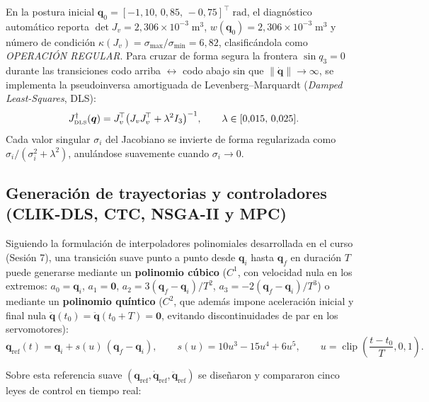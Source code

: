 \documentclass[11pt,a4paper]{article}
\newcommand{\T}{^{\!\top}}
\newcommand{\norm}[1]{\left\lVert#1\right\rVert}
\newcommand{\qdot}{\dot{\bm{q}}}
\newcommand{\qddot}{\ddot{\bm{q}}}
\newcommand{\Jdls}{J^{\dagger}_{\text{\tiny DLS}}}
\begin{document}
\medskip
En la postura inicial $\bm{q}_{0}=[-1{,}10,\,0{,}85,\,-0{,}75]\T\;\text{rad}$, el diagnóstico automático reporta $\det J_{v}=2{,}306\times 10^{-3}\;\text{m}^{3}$, $w(\bm{q}_{0})=2{,}306\times 10^{-3}\;\text{m}^{3}$ y número de condición $\kappa(J_{v})=\sigma_{\max}/\sigma_{\min}=6{,}82$, clasificándola como \emph{OPERACIÓN REGULAR}. Para cruzar de forma segura la frontera $\sin q_{3}=0$ durante las transiciones codo arriba $\leftrightarrow$ codo abajo sin que $\norm{\qdot}\to\infty$, se implementa la pseudoinversa amortiguada de Levenberg--Marquardt (\emph{Damped Least-Squares}, DLS):
\begin{equation}\label{eq:dls}
\Jdls(\bm{q})=J_{v}\T\bigl(J_{v}J_{v}\T+\lambda^{2}I_{3}\bigr)^{-1},\qquad \lambda\in[0{,}015,\,0{,}025].
\end{equation}
Cada valor singular $\sigma_{i}$ del Jacobiano se invierte de forma regularizada como $\sigma_{i}/(\sigma_{i}^{2}+\lambda^{2})$, anulándose suavemente cuando $\sigma_{i}\to 0$.

\subsection{Generación de trayectorias y controladores (CLIK-DLS, CTC, NSGA-II y MPC)}
\label{sec:ctrl}

Siguiendo la formulación de interpoladores polinomiales desarrollada en el curso (Sesión 7), una transición suave punto a punto desde $\bm{q}_{i}$ hasta $\bm{q}_{f}$ en duración $T$ puede generarse mediante un \textbf{polinomio cúbico} ($C^{1}$, con velocidad nula en los extremos: $a_{0}=\bm{q}_{i}$, $a_{1}=\bm{0}$, $a_{2}=3(\bm{q}_{f}-\bm{q}_{i})/T^{2}$, $a_{3}=-2(\bm{q}_{f}-\bm{q}_{i})/T^{3}$) o mediante un \textbf{polinomio quíntico} ($C^{2}$, que además impone aceleración inicial y final nula $\qddot(t_{0})=\qddot(t_{0}+T)=\bm{0}$, evitando discontinuidades de par en los servomotores):
\begin{equation}\label{eq:quintic}
\bm{q}_{\text{ref}}(t)=\bm{q}_{i}+s(u)\,(\bm{q}_{f}-\bm{q}_{i}),\qquad s(u)=10u^{3}-15u^{4}+6u^{5},\qquad u=\operatorname{clip}\!\left(\frac{t-t_{0}}{T},0,1\right).
\end{equation}

Sobre esta referencia suave $(\bm{q}_{\text{ref}},\qdot_{\text{ref}},\qddot_{\text{ref}})$ se diseñaron y compararon cinco leyes de control en tiempo real:
\end{document}
